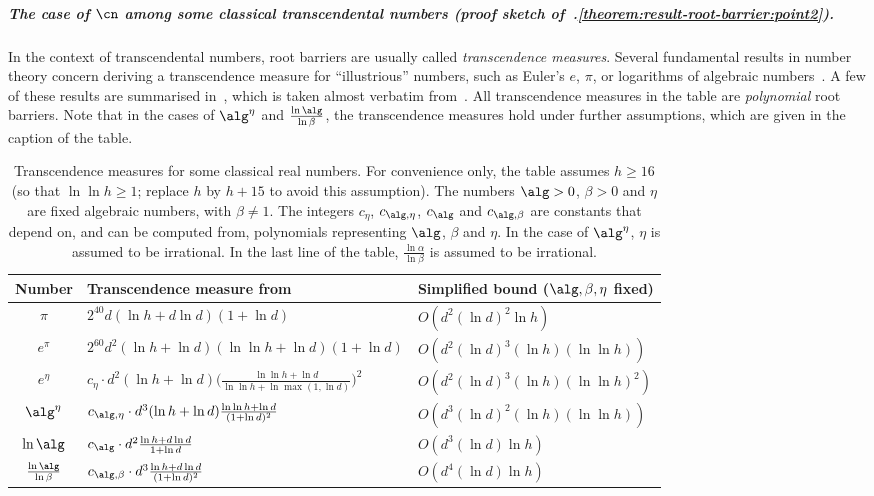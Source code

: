 \subparagraph*{The case of $\cn$ among some classical transcendental numbers (proof sketch of~.\ref{theorem:result-root-barrier:point2}).}%
In the context of transcendental numbers, root barriers are usually called
\emph{transcendence measures}. Several fundamental results in number theory
concern deriving a transcendence measure for ``illustrious'' numbers, such as
Euler's $e$, $\pi$, or logarithms of algebraic
numbers~\cite{Popken29,Mahler32,Waldschmidt78}. A few of these results are
summarised in~, which is taken almost verbatim
from~\cite[Fig.~1 and Corollary~4.2]{Waldschmidt78}. All transcendence
measures in the table are \emph{polynomial} root barriers. Note that in the cases of
$\alg^\eta$ and $\frac{\ln \alg}{\ln \beta}$, the transcendence measures hold
under further assumptions, which are given in the caption of the table.
\begin{table} 
  \begin{center}
  \def\arraystretch{1.15}
    \begin{tabular}{c|l|l}
      Number & \hfill Transcendence measure from~\cite{Waldschmidt78} & \hfill Simplified bound ($\alg,\beta,\eta$ fixed)\\[2pt]
      \hline
      \rule{0pt}{1.1\normalbaselineskip}
      $\pi$ & $2^{40} d (\ln h + d \ln d)(1 + \ln d)$
      & $O(d^2 (\ln d)^2 \ln h)$\\
      $e^\pi$ & $2^{60} d^2 (\ln h + \ln d)(\ln \ln h + \ln d)(1 + \ln d)$
      & $O(d^2 (\ln d)^3 (\ln h) (\ln \ln h))$\\
      $e^\eta$ & $c_\eta \cdot d^2(\ln h + \ln d)\big(\frac{\ln \ln h + \ln d}{\ln \ln h + \ln \max(1,\ln d)}\big)^2$
      & $O(d^2 (\ln d)^3 (\ln h)(\ln \ln h)^2)$\\ 
      $\alg^\eta$ 
      & $c_{\alg,\eta} \cdot d^3 (\ln h + \ln d)\frac{\ln \ln h + \ln d}{(1+\ln d)^2}$
      & $O(d^3 (\ln d)^2(\ln h)(\ln \ln h))$\\
      $\ln \alg$ & $c_\alg \cdot d^2 \frac{\ln h + d \ln d}{1+\ln d}$ & $O(d^3 (\ln d) \ln h)$\\ 
      $\frac{\ln \alg}{\ln \beta}$ 
      & $c_{\alg,\beta} \cdot d^3 \frac{\ln h + d \ln d}{(1+\ln d)^2}$
      & $O(d^4 (\ln d) \ln h)$\\
    \end{tabular}
    \vspace{-4pt}
  \end{center}
\caption{Transcendence measures for some classical real numbers. 
For convenience only, the table assumes $h \geq 16$ (so that $\ln \ln h \geq 1$; replace $h$ by $h+15$ to avoid this assumption).
The numbers $\alg > 0$, $\beta > 0$ and $\eta$ are fixed algebraic numbers, with $\beta \neq 1$.
The integers $c_{\eta}$, $c_{\alg,\eta}$, $c_{\alg}$ and $c_{\alg,\beta}$ are constants that depend on, and can be computed from, polynomials representing $\alg$, $\beta$ and $\eta$.
In the case of $\alg^\eta$, $\eta$ is assumed to be irrational.
In the last line of the table, $\frac{\ln \alpha}{\ln \beta}$ is assumed to be irrational.\vspace{-2pt}}%
\label{table:transcendence-degrees}%
\end{table}

